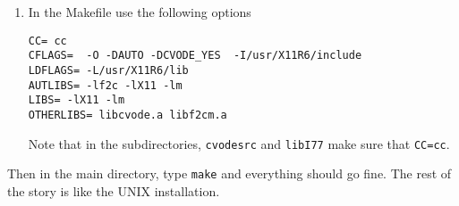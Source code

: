 \documentclass{article}
\begin{document}
\begin{enumerate}
\item In the Makefile use the following options
\begin{verbatim}
CC= cc
CFLAGS=  -O -DAUTO -DCVODE_YES  -I/usr/X11R6/include
LDFLAGS= -L/usr/X11R6/lib
AUTLIBS= -lf2c -lX11 -lm
LIBS= -lX11 -lm
OTHERLIBS= libcvode.a libf2cm.a
\end{verbatim}
Note that in the subdirectories, {\tt cvodesrc} and {\tt libI77}
make sure that {\tt CC=cc}. 
\end{enumerate}

Then in the main directory, type {\tt make} and everything should go
fine.  The rest of the story is like the UNIX installation.
\end{document}
